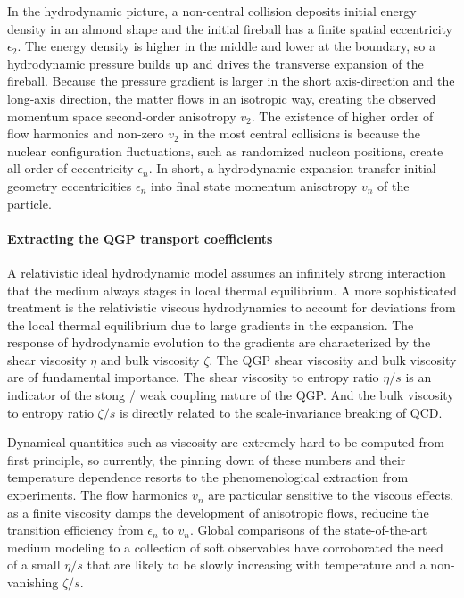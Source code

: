 In the hydrodynamic picture, a non-central collision deposits initial energy density in an almond shape and the initial fireball has a finite spatial eccentricity $\epsilon_2$.
The energy density is higher in the middle and lower at the boundary, so a hydrodynamic pressure builds up and drives the transverse expansion of the fireball.
Because the pressure gradient is larger in the short axis-direction and the long-axis direction, the matter flows in an isotropic way, creating the observed momentum space second-order anisotropy $v_2$.
The existence of higher order of flow harmonics and non-zero $v_2$ in the most central collisions is because the nuclear configuration fluctuations, such as randomized nucleon positions, create all order of eccentricity $\epsilon_n$.
In short, a hydrodynamic expansion transfer initial geometry eccentricities $\epsilon_n$ into final state momentum anisotropy $v_n$ of the particle.

\paragraph{Extracting the QGP transport coefficients}
A relativistic ideal hydrodynamic model assumes an infinitely strong interaction that the medium always stages in local thermal equilibrium.
A more sophisticated treatment is the relativistic viscous hydrodynamics to account for deviations from the local thermal equilibrium due to large gradients in the expansion.
The response of hydrodynamic evolution to the gradients are characterized by the shear viscosity $\eta$ and bulk viscosity $\zeta$.
The QGP shear viscosity and bulk viscosity are of fundamental importance. 
The shear viscosity to entropy ratio $\eta/s$ is an indicator of the stong / weak coupling nature of the QGP. 
And the bulk viscosity to entropy ratio $\zeta/s$ is directly related to  the scale-invariance breaking of QCD.

Dynamical quantities such as viscosity are extremely hard to be computed from first principle, so currently, the pinning down of these numbers and their temperature dependence resorts to the phenomenological extraction from experiments.
The flow harmonics $v_n$ are particular sensitive to the viscous effects, as a finite viscosity damps the development of anisotropic flows, reducine the transition efficiency from $\epsilon_n$ to $v_n$.
Global comparisons of the state-of-the-art medium modeling to a collection of soft observables have corroborated the need of a small $\eta/s$ that are likely to be slowly increasing with temperature and a non-vanishing $\zeta/s$.

